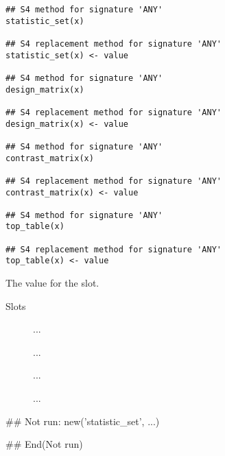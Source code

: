 \documentclass[letterpaper]{book}
\begin{document}
%
\begin{Usage}
\begin{verbatim}
## S4 method for signature 'ANY'
statistic_set(x)

## S4 replacement method for signature 'ANY'
statistic_set(x) <- value

## S4 method for signature 'ANY'
design_matrix(x)

## S4 replacement method for signature 'ANY'
design_matrix(x) <- value

## S4 method for signature 'ANY'
contrast_matrix(x)

## S4 replacement method for signature 'ANY'
contrast_matrix(x) <- value

## S4 method for signature 'ANY'
top_table(x)

## S4 replacement method for signature 'ANY'
top_table(x) <- value
\end{verbatim}
\end{Usage}
%
\begin{Arguments}
\begin{ldescription}
\item[\code{value}] The value for the slot.
\end{ldescription}
\end{Arguments}
%
\begin{Section}{Slots}

\begin{description}

\item[] ...

\item[] ...

\item[] ...

\item[] ...

\end{description}
\end{Section}
%
\begin{Examples}
\begin{ExampleCode}
## Not run: 
new('statistic_set', ...)

## End(Not run)
\end{ExampleCode}
\end{Examples}
\end{document}
